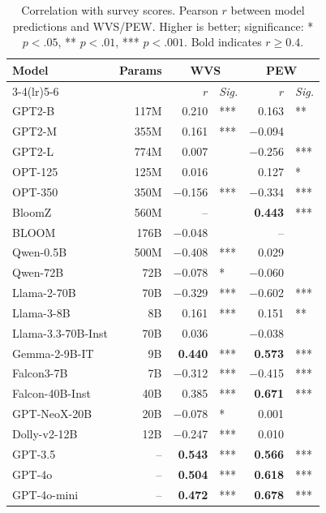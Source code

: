 \documentclass[a4paper,10pt,twoside]{article}
\begin{document}
\begin{table}[htbp]
\centering
\small
\caption{Correlation with survey scores. Pearson $r$ between model predictions and WVS/PEW. Higher is better; significance: * $p<.05$, ** $p<.01$, *** $p<.001$. Bold indicates $r \geq 0.4$.}
\label{tab:AllCorrelationsStars}
\begin{tabular}{@{} l r r l r l @{}}
\toprule
\textbf{Model} & \textbf{Params} & \multicolumn{2}{c}{\textbf{WVS}} & \multicolumn{2}{c}{\textbf{PEW}} \\
\cmidrule(lr){3-4}\cmidrule(lr){5-6}
 & & $r$ & \textit{Sig.} & $r$ & \textit{Sig.} \\
\midrule
GPT2-B & 117M & 0.210 & *** & 0.163 & ** \\
GPT2-M & 355M & 0.161 & *** & $-$0.094 & \\
GPT2-L & 774M & 0.007 & & $-$0.256 & *** \\
\midrule
OPT-125 & 125M & 0.016 & & 0.127 & * \\
OPT-350 & 350M & $-$0.156 & *** & $-$0.334 & *** \\
\midrule
BloomZ & 560M & -- & & \textbf{0.443} & *** \\
BLOOM & 176B & $-$0.048 & & -- & \\
Qwen-0.5B & 500M & $-$0.408 & *** & 0.029 & \\
Qwen-72B & 72B & $-$0.078 & * & $-$0.060 & \\
\midrule
Llama-2-70B & 70B & $-$0.329 & *** & $-$0.602 & *** \\
Llama-3-8B & 8B & 0.161 & *** & 0.151 & ** \\
Llama-3.3-70B-Inst & 70B & 0.036 & & $-$0.038 & \\
\midrule
Gemma-2-9B-IT & 9B & \textbf{0.440} & *** & \textbf{0.573} & *** \\
Falcon3-7B & 7B & $-$0.312 & *** & $-$0.415 & *** \\
Falcon-40B-Inst & 40B & 0.385 & *** & \textbf{0.671} & *** \\
GPT-NeoX-20B & 20B & $-$0.078 & * & 0.001 & \\
Dolly-v2-12B & 12B & $-$0.247 & *** & 0.010 & \\
\midrule
GPT-3.5 & -- & \textbf{0.543} & *** & \textbf{0.566} & *** \\
GPT-4o & -- & \textbf{0.504} & *** & \textbf{0.618} & *** \\
GPT-4o-mini & -- & \textbf{0.472} & *** & \textbf{0.678} & *** \\
\bottomrule
\end{tabular}
\end{table}
\end{document}
